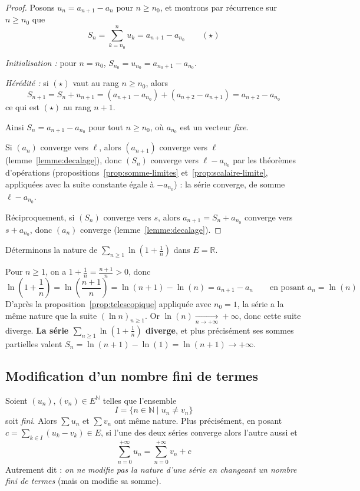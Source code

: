 \begin{proof}
Posons $u_n=a_{n+1}-a_n$ pour $n\geq n_0$, et montrons par récurrence sur $n\geq n_0$ que
\[S_n = \sum_{k=n_0}^{n} u_k = a_{n+1}-a_{n_0} \qquad (\star)\]

\emph{Initialisation :} pour $n=n_0$, $S_{n_0}=u_{n_0}=a_{n_0+1}-a_{n_0}$.

\emph{Hérédité :} si $(\star)$ vaut au rang $n\geq n_0$, alors
\[S_{n+1}=S_n+u_{n+1}=(a_{n+1}-a_{n_0})+(a_{n+2}-a_{n+1})=a_{n+2}-a_{n_0}\]
ce qui est $(\star)$ au rang $n+1$.

Ainsi $S_n=a_{n+1}-a_{n_0}$ pour tout $n\geq n_0$, où $a_{n_0}$ est un vecteur \emph{fixe}.

Si $(a_n)$ converge vers $\ell$, alors $(a_{n+1})$ converge vers $\ell$ (lemme~\ref{lemme:decalage}), donc $(S_n)$ converge vers $\ell-a_{n_0}$ par les théorèmes d'opérations (propositions~\ref{prop:somme-limites} et~\ref{prop:scalaire-limite}, appliquées avec la suite constante égale à $-a_{n_0}$) : la série converge, de somme $\ell-a_{n_0}$.

Réciproquement, si $(S_n)$ converge vers $s$, alors $a_{n+1}=S_n+a_{n_0}$ converge vers $s+a_{n_0}$, donc $(a_n)$ converge (lemme~\ref{lemme:decalage}).
\end{proof}

\begin{exemple}
\label{ex:serie-ln}
Déterminons la nature de $\displaystyle\sum_{n\geq 1}\ln\!\left(1+\frac{1}{n}\right)$ dans $E=\mathbb{R}$.

Pour $n\geq 1$, on a $1+\frac{1}{n}=\frac{n+1}{n}>0$, donc
\[\ln\!\left(1+\frac{1}{n}\right) = \ln\!\left(\frac{n+1}{n}\right) = \ln(n+1)-\ln(n) = a_{n+1}-a_n \qquad\text{en posant } a_n=\ln(n)\]
D'après la proposition~\ref{prop:telescopique} appliquée avec $n_0=1$, la série a la même nature que la suite $(\ln n)_{n\geq1}$. Or $\ln(n)\xrightarrow[n\to+\infty]{}+\infty$, donc cette suite diverge. \textbf{La série $\sum_{n\geq1}\ln(1+\frac1n)$ diverge}, et plus précisément ses sommes partielles valent $S_n=\ln(n+1)-\ln(1)=\ln(n+1)\to+\infty$.
\end{exemple}

\subsection{Modification d'un nombre fini de termes}

\begin{prop}
\label{prop:nombre-fini-termes}
Soient $(u_n),(v_n)\in E^{\mathbb{N}}$ telles que l'ensemble
\[I=\{n\in\mathbb{N}\mid u_n\neq v_n\}\]
soit \emph{fini}. Alors $\sum u_n$ et $\sum v_n$ ont même nature. Plus précisément, en posant $c=\sum_{k\in I}(u_k-v_k)\in E$, si l'une des deux séries converge alors l'autre aussi et
\[\sum_{n=0}^{+\infty} u_n = \sum_{n=0}^{+\infty} v_n + c\]
Autrement dit : \emph{on ne modifie pas la nature d'une série en changeant un nombre fini de termes} (mais on modifie sa somme).
\end{prop}

